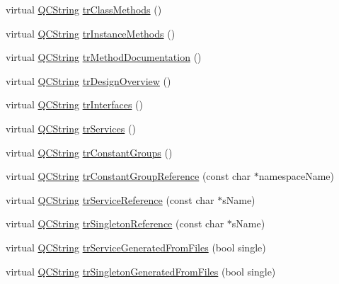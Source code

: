 \begin{DoxyCompactItemize}
\item 
virtual \hyperlink{class_q_c_string}{Q\-C\-String} \hyperlink{class_translator_dutch_a00e0dc60db9c989dad1bc310b4bdf08c}{tr\-Class\-Methods} ()
\item 
virtual \hyperlink{class_q_c_string}{Q\-C\-String} \hyperlink{class_translator_dutch_ac194051c0538db0a70504f6d11fbf9b7}{tr\-Instance\-Methods} ()
\item 
virtual \hyperlink{class_q_c_string}{Q\-C\-String} \hyperlink{class_translator_dutch_a4666cdb4ca29df1818744d88fc17e619}{tr\-Method\-Documentation} ()
\item 
virtual \hyperlink{class_q_c_string}{Q\-C\-String} \hyperlink{class_translator_dutch_a5aeee72580ed889d0f0253be39800cc8}{tr\-Design\-Overview} ()
\item 
virtual \hyperlink{class_q_c_string}{Q\-C\-String} \hyperlink{class_translator_dutch_a3e32b2fdb1d61783cd0fa4734beed3da}{tr\-Interfaces} ()
\item 
virtual \hyperlink{class_q_c_string}{Q\-C\-String} \hyperlink{class_translator_dutch_a0a0aa68d1d3b75a4b3dd395c7b624f64}{tr\-Services} ()
\item 
virtual \hyperlink{class_q_c_string}{Q\-C\-String} \hyperlink{class_translator_dutch_a92c2fd6605d059463589fcef7b1cea79}{tr\-Constant\-Groups} ()
\item 
virtual \hyperlink{class_q_c_string}{Q\-C\-String} \hyperlink{class_translator_dutch_afee1f6e0599fe1d0938c65e7adce44ba}{tr\-Constant\-Group\-Reference} (const char $\ast$namespace\-Name)
\item 
virtual \hyperlink{class_q_c_string}{Q\-C\-String} \hyperlink{class_translator_dutch_ade4a083ba7d9b0c1317c6c36f5bce96c}{tr\-Service\-Reference} (const char $\ast$s\-Name)
\item 
virtual \hyperlink{class_q_c_string}{Q\-C\-String} \hyperlink{class_translator_dutch_a548555333d671f53e736a598b1d797a0}{tr\-Singleton\-Reference} (const char $\ast$s\-Name)
\item 
virtual \hyperlink{class_q_c_string}{Q\-C\-String} \hyperlink{class_translator_dutch_ab5801f97b602eaa907d969d8cc05be08}{tr\-Service\-Generated\-From\-Files} (bool single)
\item 
virtual \hyperlink{class_q_c_string}{Q\-C\-String} \hyperlink{class_translator_dutch_aefe3e3adb305c5ae4ea863f4586ab0f0}{tr\-Singleton\-Generated\-From\-Files} (bool single)
\end{DoxyCompactItemize}


